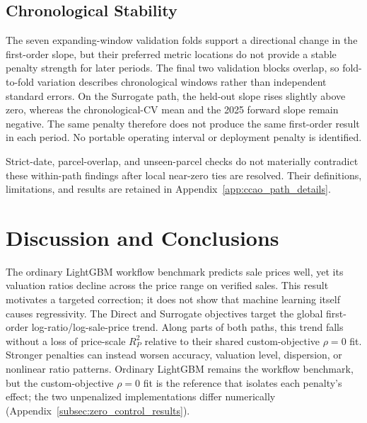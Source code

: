 \documentclass[10pt]{article}
\theoremstyle{definition}
\newcommand{\1}{\mathbf{1}}
\begin{document}
\subsection{Chronological Stability}
\label{subsec:path_stability_results}

The seven expanding-window validation folds support a directional change in the first-order slope, but their preferred metric locations do not provide a stable penalty strength for later periods. The final two validation blocks overlap, so fold-to-fold variation describes chronological windows rather than independent standard errors. On the Surrogate path, the held-out slope rises slightly above zero, whereas the chronological-CV mean and the 2025 forward slope remain negative. The same penalty therefore does not produce the same first-order result in each period. No portable operating interval or deployment penalty is identified.

Strict-date, parcel-overlap, and unseen-parcel checks do not materially contradict these within-path findings after local near-zero ties are resolved. Their definitions, limitations, and results are retained in Appendix~\ref{app:ccao_path_details}.

\section{Discussion and Conclusions}
\label{sec:discussion}

The ordinary LightGBM workflow benchmark predicts sale prices well, yet its
valuation ratios decline across the price range on verified sales. This result
motivates a targeted correction; it does not show that machine learning itself
causes regressivity. The Direct and Surrogate objectives target the global
first-order log-ratio/log-sale-price trend. Along parts of both paths, this
trend falls without a loss of price-scale $R^2_P$ relative to their shared
custom-objective $\rho=0$ fit. Stronger penalties can instead worsen accuracy,
valuation level, dispersion, or nonlinear ratio patterns. Ordinary LightGBM
remains the workflow benchmark, but the custom-objective $\rho=0$ fit is the
reference that isolates each penalty's effect; the two unpenalized
implementations differ numerically (Appendix~\ref{subsec:zero_control_results}).
\end{document}
